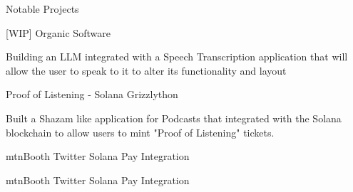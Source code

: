 \documentclass{resume} %
\begin{document}
\begin{rSection}{Notable Projects}

\begin{rSubsection}{[WIP] Organic Software}{}{}{}
\item Building an LLM integrated with a Speech Transcription application that will allow the user to speak to it to alter its functionality and layout
\end{rSubsection}

\begin{rSubsection}{Proof of Listening - Solana Grizzlython}{}{}{}
\item Built a Shazam like application for Podcasts that integrated with the Solana blockchain to allow users to mint "Proof of Listening" tickets. 
\end{rSubsection}

\begin{rSubsection}{mtnBooth Twitter Solana Pay Integration}{}{}{}
\item mtnBooth Twitter Solana Pay Integration
\end{rSubsection}


\end{rSection}


\end{document}
